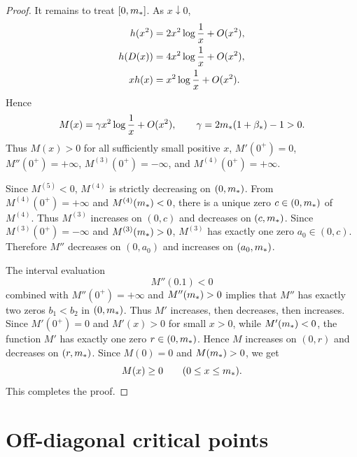 \begin{proof}
It remains to treat \([0,m_*]\).  As \(x\downarrow0\),
\begin{align}\label{eq:M_zero_expand}
  h(x^2)&=2x^2\log\frac1x+O(x^2),\notag\\
  h(D(x))&=4x^2\log\frac1x+O(x^2),\notag\\
  xh(x)&=x^2\log\frac1x+O(x^2).
\end{align}
Hence
\begin{equation}\label{eq:M_zero_leading}
  M(x)=\gamma x^2\log\frac1x+O(x^2),
  \qquad
  \gamma=2m_*(1+\beta_*)-1>0.
\end{equation}
Thus \(M(x)>0\) for all sufficiently small positive \(x\), \(M'(0^+)=0\), \(M''(0^+)=+\infty\), \(M^{(3)}(0^+)=-\infty\), and \(M^{(4)}(0^+)=+\infty\).

Since \(M^{(5)}<0\), \(M^{(4)}\) is strictly decreasing on \((0,m_*)\).  From \(M^{(4)}(0^+)=+\infty\) and \(M^{(4)}(m_*)<0\), there is a unique zero \(c\in(0,m_*)\) of \(M^{(4)}\).  Thus \(M^{(3)}\) increases on \((0,c)\) and decreases on \((c,m_*)\).  Since \(M^{(3)}(0^+)=-\infty\) and \(M^{(3)}(m_*)>0\), \(M^{(3)}\) has exactly one zero \(a_0\in(0,c)\).  Therefore \(M''\) decreases on \((0,a_0)\) and increases on \((a_0,m_*)\).

The interval evaluation
\begin{equation}\label{eq:M2_01}
  M''(0.1)<0
\end{equation}
combined with \(M''(0^+)=+\infty\) and \(M''(m_*)>0\) implies that \(M''\) has exactly two zeros \(b_1<b_2\) in \((0,m_*)\).  Thus \(M'\) increases, then decreases, then increases.  Since \(M'(0^+)=0\) and \(M'(x)>0\) for small \(x>0\), while \(M'(m_*)<0\), the function \(M'\) has exactly one zero \(r\in(0,m_*)\).  Hence \(M\) increases on \((0,r)\) and decreases on \((r,m_*)\).  Since \(M(0)=0\) and \(M(m_*)>0\), we get
\begin{equation}\label{eq:M_ge_zero_m}
  M(x)\ge0\qquad(0\le x\le m_*).
\end{equation}
This completes the proof.
\end{proof}

\section{Off-diagonal critical points}\label{sec:offdiagonal}

